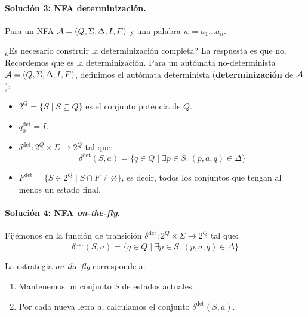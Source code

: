 \paragraph{Solución 3: NFA determinización.} Para un NFA $\mathcal{A} = (Q,\Sigma,\Delta, I, F)$ y una palabra $w = a_1 \ldots a_n$.
\vspace{-8pt}
\begin{algorithm}[hbt!]
    \DontPrintSemicolon
\end{algorithm}

¿Es necesario construir la determinización completa? La respuesta es que no. Recordemos que es la determinización. Para un autómata no-determinista $\mathcal{A} = (Q,\Sigma,\Delta,I,F)$, definimos el autómata determinista (\textbf{determinización} de $\mathcal{A}$):
\begin{itemize}
    \item $2^Q = \{S \mid S\subseteq Q\}$ es el conjunto potencia de $Q$.
    \item $q_0^\text{det} = I$.
    \item $\delta^\text{det}: 2^Q \times \Sigma \to 2^Q$ tal que:
          $$
              \delta^\text{det}(S,a) = \{q \in Q \mid \exists p \in S.\ (p,a,q) \in \Delta\}
          $$
    \item $F^\text{det} = \{S \in 2^Q \mid S \cap F \neq \varnothing\}$, es decir, todos los conjuntos que tengan al menos un estado final.
\end{itemize}

\paragraph{Solución 4: NFA \textit{on-the-fly}.} Fijémonos en la función de transición $\delta^\text{det}: 2^Q \times \Sigma \to 2^Q$ tal que:
$$
    \delta^\text{det}(S,a) = \{q \in Q \mid \exists p \in S.\ (p,a,q) \in \Delta\}
$$

La estrategia \textit{on-the-fly} corresponde a:
\begin{enumerate}
    \item Mantenemos un conjunto $S$ de estados actuales.
    \item Por cada nueva letra $a$, calculamos el conjunto $\delta^{\text{det}}(S,a)$.
\end{enumerate}

